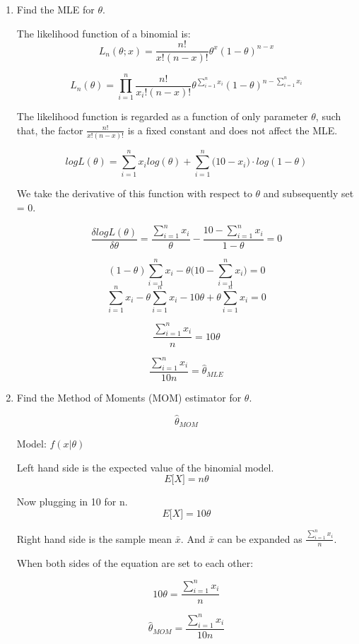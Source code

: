 \documentclass[letterpaper]{article}
\begin{document}
\begin{enumerate}
\begin{enumerate}
\item Find the MLE for $\theta$.

The likelihood function of a binomial is:
$$L_{n}(\theta;x) = \frac{n!}{x!(n-x)!}\theta^{x}(1-\theta)^{n-x}$$

$$L_{n}(\theta) = \prod^{n}_{i=1} \frac{n!}{x_{i}!(n-x)!}\theta^{\sum^{n}_{i=1}{x_{i}}}(1-\theta)^{n-\sum^{n}_{i=1}{x_{i}}}$$


The likelihood function is regarded as a function of only parameter $\theta$, such that, the factor $\frac{n!}{x!(n-x)!}$ is a fixed constant and does not affect the MLE. 

$$logL(\theta) = \sum^{n}_{i=1}{x_{i}}log(\theta) + \sum^{n}_{i=1}\big(10-x_{i}\big) \cdot log(1-\theta)$$

We take the derivative of this function with respect to $\theta$ and subsequently set = 0.

$$\frac{\delta logL(\theta)}{\delta\theta} = \frac{\sum^{n}_{i=1}{x_{i}}}{\theta} - \frac{10-\sum^{n}_{i=1}{x_{i}}}{1-\theta} = 0 $$


$$(1 - \theta)\sum^{n}_{i=1}{x_{i}} - \theta \big(10 - \sum^{n}_{i=1}{x_{i}}\big) = 0$$
$$\sum^{n}_{i=1}{x_{i}} - \theta\sum^{n}_{i=1}{x_{i}} - 10\theta + \theta\sum^{n}_{i=1}{x_{i}} = 0$$






$$\frac{\sum^{n}_{i=1}{x_{i}}}{n} = 10\theta$$

$$\frac{\sum^{n}_{i=1}{x_{i}}}{10n} = \hat{\theta}_{MLE} $$


\item Find the Method of Moments (MOM) estimator for $\theta$.
 
$$\hat{\theta}_{MOM}$$

Model: $f(x\big|\theta)$

Left hand side is the expected value of the binomial model.
$$E\big[ X \big] = n\theta$$

Now plugging in 10 for n.
$$E\big[ X \big] = 10\theta$$


Right hand side is the sample mean $\bar{x}$. And $\bar{x}$ can be expanded as $\frac{\sum^{n}_{i=1}{x_{i}}}{n}$.

When both sides of the equation are set to each other:

$$ 10\theta = \frac{\sum^{n}_{i=1}{x_{i}}}{n} $$ 

$$\hat{\theta}_{MOM} = \frac{\sum^{n}_{i=1}{x_{i}}}{10n} $$
\end{enumerate}


\end{enumerate}
\end{document}
